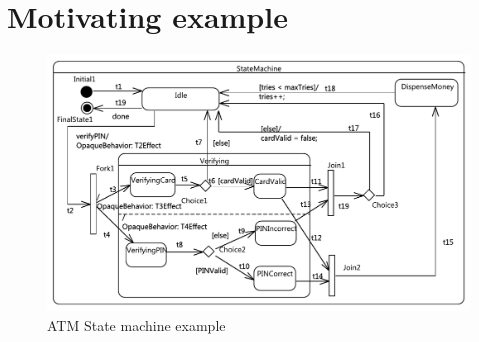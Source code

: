 \section{Motivating example}
\begin{figure}
	\centering
	\includegraphics[clip, trim=0.2cm 0.2cm 0.2cm 0.2cm, width=1.0\columnwidth]{figures/ATM.pdf}
	\caption{ATM State machine example} 
	\label{fig:example}
\end{figure}